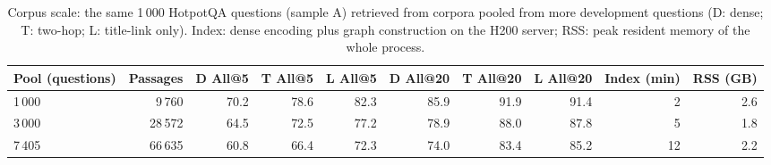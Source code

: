 \begin{table}[t]
\centering
\footnotesize
\caption{Corpus scale: the same 1\,000 HotpotQA questions (sample A) retrieved from corpora pooled from more development questions (D: dense; T: two-hop; L: title-link only). Index: dense encoding plus graph construction on the H200 server; RSS: peak resident memory of the whole process.}
\label{tab:scale}
\begin{tabular}{lrrrrrrrrr}
\toprule
Pool (questions) & Passages & D All@5 & T All@5 & L All@5 & D All@20 & T All@20 & L All@20 & Index (min) & RSS (GB) \\
\midrule
1\,000 & 9\,760 & 70.2 & 78.6 & 82.3 & 85.9 & 91.9 & 91.4 & 2 & 2.6 \\
3\,000 & 28\,572 & 64.5 & 72.5 & 77.2 & 78.9 & 88.0 & 87.8 & 5 & 1.8 \\
7\,405 & 66\,635 & 60.8 & 66.4 & 72.3 & 74.0 & 83.4 & 85.2 & 12 & 2.2 \\
\bottomrule
\end{tabular}
\end{table}
